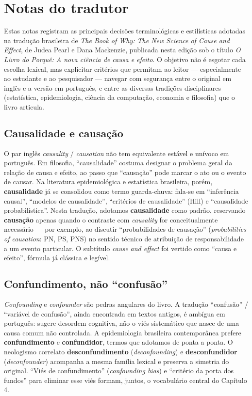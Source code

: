 \documentclass[11pt,a5paper,twoside]{book}
\begin{document}
\chapter{Notas do tradutor}
Estas notas registram as principais decisões terminológicas e estilísticas adotadas na tradução brasileira de \textit{The Book of Why: The New Science of Cause and Effect}, de Judea Pearl e Dana Mackenzie, publicada nesta edição sob o título \textit{O Livro do Porquê: A nova ciência de causa e efeito}. O objetivo não é esgotar cada escolha lexical, mas explicitar critérios que permitam ao leitor — especialmente ao estudante e ao pesquisador — navegar com segurança entre o original em inglês e a versão em português, e entre as diversas tradições disciplinares (estatística, epidemiologia, ciência da computação, economia e filosofia) que o livro articula.

\section{Causalidade e causação}
O par inglês \textit{causality} / \textit{causation} não tem equivalente estável e unívoco em português. Em filosofia, “causalidade” costuma designar o problema geral da relação de causa e efeito, ao passo que “causação” pode marcar o ato ou o evento de causar. Na literatura epidemiológica e estatística brasileira, porém, \textbf{causalidade} já se consolidou como termo guarda-chuva: fala-se em “inferência causal”, “modelos de causalidade”, “critérios de causalidade” (Hill) e “causalidade probabilística”. Nesta tradução, adotamos \textbf{causalidade} como padrão, reservando \textbf{causação} apenas quando o contraste com \textit{causality} for conceitualmente necessário — por exemplo, ao discutir “probabilidades de causação” (\textit{probabilities of causation}: PN, PS, PNS) no sentido técnico de atribuição de responsabilidade a um evento particular. O subtítulo \textit{cause and effect} foi vertido como “causa e efeito”, fórmula já clássica e legível.

\section{Confundimento, não “confusão”}
\textit{Confounding} e \textit{confounder} são pedras angulares do livro. A tradução “confusão” / “variável de confusão”, ainda encontrada em textos antigos, é ambígua em português: sugere desordem cognitiva, não o viés sistemático que nasce de uma causa comum não controlada. A epidemiologia brasileira contemporânea prefere \textbf{confundimento} e \textbf{confundidor}, termos que adotamos de ponta a ponta. O neologismo correlato \textbf{desconfundimento} (\textit{deconfounding}) e \textbf{desconfundidor} (\textit{deconfounder}) acompanha a mesma família lexical e preserva a simetria do original. “Viés de confundimento” (\textit{confounding bias}) e “critério da porta dos fundos” para eliminar esse viés formam, juntos, o vocabulário central do Capítulo 4.
\end{document}
